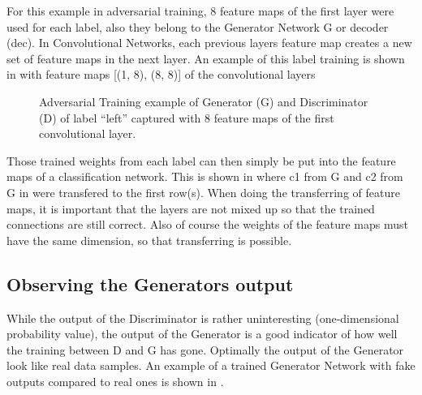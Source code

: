 For this example in adversarial training, 8 feature maps of the first layer were used for each label, also they belong to the Generator Network G or decoder (dec). In Convolutional Networks, each previous layers feature map creates a new set of feature maps in the next layer.
An example of this label training is shown in  with feature maps [(1, 8), (8, 8)] of the convolutional layers

\begin{figure}[!ht]
  \centering
  \caption{Adversarial Training example of Generator (G) and Discriminator (D) of label \enquote{left} captured with 8 feature maps of the first convolutional layer.}
  \label{fig:nn_adv_example_label}
\end{figure}
\FloatBarrier
\noindent

Those trained weights from each label can then simply be put into the feature maps of a classification network.
This is shown in  where c1 from G and c2 from G in  were transfered to the first row(s).
When doing the transferring of feature maps, it is important that the layers are not mixed up so that the trained connections are still correct.
Also of course the weights of the feature maps must have the same dimension, so that transferring is possible.


\subsection{Observing the Generators output}
While the output of the Discriminator is rather uninteresting (one-dimensional probability value), the output of the Generator is a good indicator of how well the training between D and G has gone.
Optimally the output of the Generator look like real data samples.
An example of a trained Generator Network with fake outputs compared to real ones is shown in .

